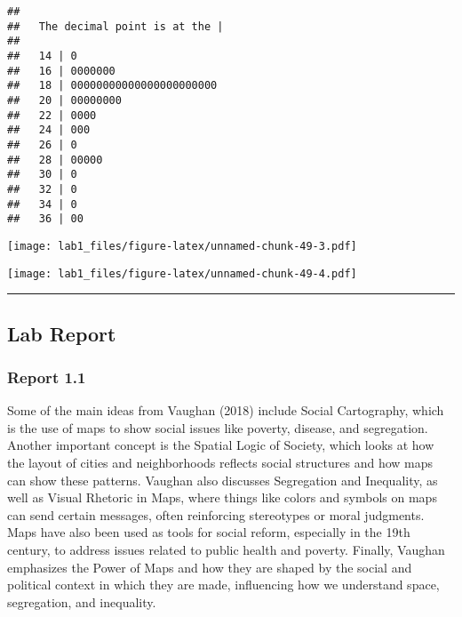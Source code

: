 \documentclass[
]{article}
\newenvironment{Shaded}{\begin{snugshade}}{\end{snugshade}}
\newcommand{\FunctionTok}[1]{\textcolor[rgb]{0.13,0.29,0.53}{\textbf{#1}}}
\newcommand{\NormalTok}[1]{#1}
\newcommand{\SpecialCharTok}[1]{\textcolor[rgb]{0.81,0.36,0.00}{\textbf{#1}}}
\begin{document}
\begin{verbatim}
## 
##   The decimal point is at the |
## 
##   14 | 0
##   16 | 0000000
##   18 | 00000000000000000000000
##   20 | 00000000
##   22 | 0000
##   24 | 000
##   26 | 0
##   28 | 00000
##   30 | 0
##   32 | 0
##   34 | 0
##   36 | 00
\end{verbatim}

\begin{Shaded}
\end{Shaded}

\texttt{[image: lab1\_files/figure-latex/unnamed-chunk-49-3.pdf]}

\begin{Shaded}
\end{Shaded}

\texttt{[image: lab1\_files/figure-latex/unnamed-chunk-49-4.pdf]}

\begin{center}\rule{0.5\linewidth}{0.5pt}\end{center}

\subsection{Lab Report}\label{lab-report}

\subsubsection{Report 1.1}\label{report-1.1}

Some of the main ideas from Vaughan (2018) include Social Cartography,
which is the use of maps to show social issues like poverty, disease,
and segregation. Another important concept is the Spatial Logic of
Society, which looks at how the layout of cities and neighborhoods
reflects social structures and how maps can show these patterns. Vaughan
also discusses Segregation and Inequality, as well as Visual Rhetoric in
Maps, where things like colors and symbols on maps can send certain
messages, often reinforcing stereotypes or moral judgments. Maps have
also been used as tools for social reform, especially in the 19th
century, to address issues related to public health and poverty.
Finally, Vaughan emphasizes the Power of Maps and how they are shaped by
the social and political context in which they are made, influencing how
we understand space, segregation, and inequality.
\end{document}
